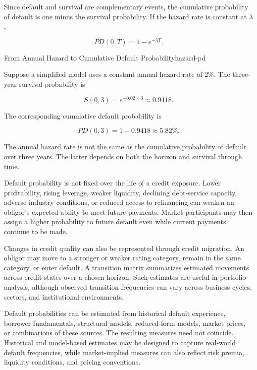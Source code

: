 Since default and survival are complementary events, the cumulative probability of default is one minus the survival probability. If the hazard rate is constant at \(\lambda\),

\begin{equation}
PD(0,T)=1-e^{-\lambda T}.
\end{equation}

\begin{example}{From Annual Hazard to Cumulative Default Probability}{hazard-pd}

Suppose a simplified model uses a constant annual hazard rate of 2\%. The three-year survival probability is

$$
S(0,3)=e^{-0.02 \times 3}\approx0.9418.
$$

The corresponding cumulative default probability is

$$
PD(0,3)=1-0.9418\approx5.82\%.
$$

The annual hazard rate is not the same as the cumulative probability of default over three years. The latter depends on both the horizon and survival through time.

\end{example}

Default probability is not fixed over the life of a credit exposure. Lower profitability, rising leverage, weaker liquidity, declining debt-service capacity, adverse industry conditions, or reduced access to refinancing can weaken an obligor's expected ability to meet future payments. Market participants may then assign a higher probability to future default even while current payments continue to be made.

Changes in credit quality can also be represented through credit migration. An obligor may move to a stronger or weaker rating category, remain in the same category, or enter default. A transition matrix summarizes estimated movements across credit states over a chosen horizon. Such estimates are useful in portfolio analysis, although observed transition frequencies can vary across business cycles, sectors, and institutional environments.

Default probabilities can be estimated from historical default experience, borrower fundamentals, structural models, reduced-form models, market prices, or combinations of these sources. The resulting measures need not coincide. Historical and model-based estimates may be designed to capture real-world default frequencies, while market-implied measures can also reflect risk premia, liquidity conditions, and pricing conventions.

